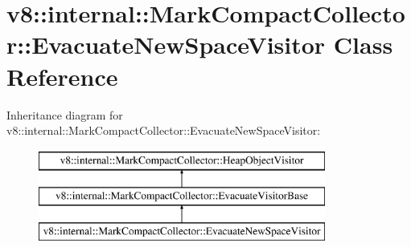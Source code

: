 \hypertarget{classv8_1_1internal_1_1_mark_compact_collector_1_1_evacuate_new_space_visitor}{}\section{v8\+:\+:internal\+:\+:Mark\+Compact\+Collector\+:\+:Evacuate\+New\+Space\+Visitor Class Reference}
\label{classv8_1_1internal_1_1_mark_compact_collector_1_1_evacuate_new_space_visitor}
Inheritance diagram for v8\+:\+:internal\+:\+:Mark\+Compact\+Collector\+:\+:Evacuate\+New\+Space\+Visitor\+:\begin{figure}[H]
\begin{center}
\leavevmode
\includegraphics[height=3.000000cm]{classv8_1_1internal_1_1_mark_compact_collector_1_1_evacuate_new_space_visitor}
\end{center}
\end{figure}
